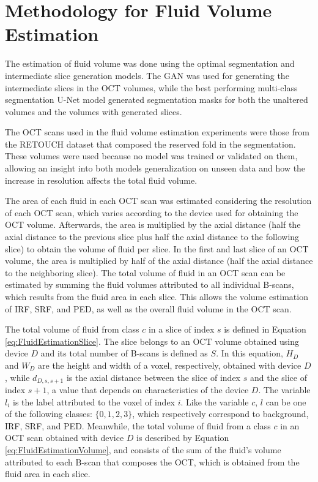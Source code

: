 \section{Methodology for Fluid Volume Estimation}
The estimation of fluid volume was done using the optimal segmentation and intermediate slice generation models. The GAN was used for generating the intermediate slices in the OCT volumes, while the best performing multi-class segmentation U-Net model generated segmentation masks for both the unaltered volumes and the volumes with generated slices. 
\par
The OCT scans used in the fluid volume estimation experiments were those from the \hbox{RETOUCH} dataset that composed the reserved fold in the segmentation. These volumes were used because no model was trained or validated on them, allowing an insight into both models generalization on unseen data and how the increase in resolution affects the total fluid volume.
\par
The area of each fluid in each OCT scan was estimated considering the resolution of each OCT scan, which varies according to the device used for obtaining the OCT volume. Afterwards, the area is multiplied by the axial distance (half the axial distance to the previous slice plus half the axial distance to the following slice) to obtain the volume of fluid per slice. In the first and last slice of an OCT volume, the area is multiplied by half of the axial distance (half the axial distance to the neighboring slice). The total volume of fluid in an OCT scan can be estimated by summing the fluid volumes attributed to all individual B-scans, which results from the fluid area in each slice. This allows the volume estimation of IRF, SRF, and PED, as well as the overall fluid volume in the OCT scan.
\par
The total volume of fluid from class $c$ in a slice of index $s$ is defined in Equation \ref{eq:FluidEstimationSlice}. The slice belongs to an OCT volume obtained using device $D$ and its total number of B-scans is defined as $S$. In this equation, $H_{D}$ and $W_{D}$ are the height and width of a voxel, respectively, obtained with device $D$, while $d_{D,s,s+1}$ is the axial distance between the slice of index $s$ and the slice of index $s+1$, a value that depends on characteristics of the device $D$. The variable $l_{i}$ is the label attributed to the voxel of index $i$. Like the variable $c$, $l$ can be one of the following classes: $\{0,1,2,3\}$, which respectively correspond to background, IRF, SRF, and PED. Meanwhile, the total volume of fluid from a class $c$ in an OCT scan obtained with device $D$ is described by Equation \ref{eq:FluidEstimationVolume}, and consists of the sum of the fluid's volume attributed to each B-scan that composes the OCT, which is obtained from the fluid area in each slice.


